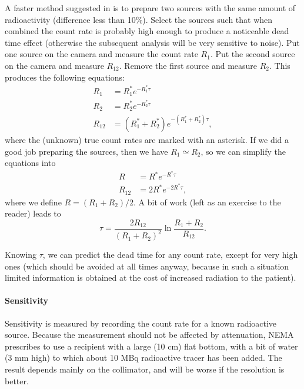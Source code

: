 \documentclass[11pt,oneside]{article}
\begin{document}
A faster method suggested in \cite{Aanbevelingen} is to prepare two sources
with the same amount of radioactivity (difference less than 10\%). Select the
sources such that when combined the count rate is probably high enough to
produce a noticeable dead time effect (otherwise the subsequent analysis will
be very sensitive to noise). Put one source on the camera and measure the
count rate $R_1$. Put the second source on the camera and measure $R_{12}$.
Remove the first source and measure $R_2$. This produces the following
equations:
\begin{align}
    R_1    &= R^\ast_1 e^{-R^\ast_1 \tau}\\
    R_2    &= R^\ast_2 e^{-R^\ast_2 \tau}\\
    R_{12} &= (R^\ast_1 + R^\ast_2) e^{-(R^\ast_1 + R^\ast_2) \tau},
\end{align}
where the (unknown) true count rates are marked with an asterisk. If we did a
good job preparing the sources, then we have $R_1 \simeq R_2$, so we can
simplify the equations into
\begin{align}
  R       &= R^\ast e^{- R^\ast \tau}\\
  R_{12}  &= 2 R^\ast e^{- 2 R^\ast \tau},
\end{align}
where we define $R = (R_1 + R_2) / 2$. A bit of work (left as an exercise
to the reader) leads to
\begin{equation}
  \tau = \frac{2 R_{12}}{(R_1 + R_2)^2} \ln \frac{R_1 + R_2}{R_{12}}.
\end{equation}

Knowing $\tau$, we can predict the dead time for any count rate, except for
very high ones (which should be avoided at all times anyway, because
in such a situation limited information is obtained at the cost of
increased radiation to the patient).

\paragraph{Sensitivity}
Sensitivity is measured by recording the count rate for a known radioactive
source. Because the measurement should not be affected by attenuation, NEMA
prescribes to use a recipient with a large (10 cm) flat bottom, with a bit of
water (3 mm high) to which about 10 MBq radioactive tracer has been added. The
result depends mainly on the collimator, and will be worse if the resolution
is better.
\end{document}
